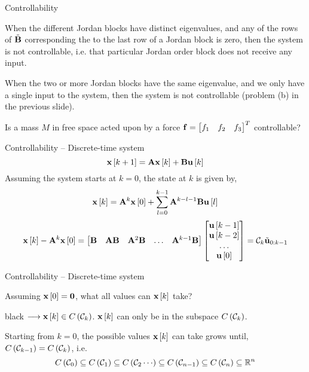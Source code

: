 \documentclass[aspectratio=169]{beamer}
\def\mf{\ensuremath\mathbf}
\def\mb{\ensuremath\mathbb}
\def\lp{\ensuremath\left(}
\def\rp{\ensuremath\right)}
\def\ls{\ensuremath\left[}
\def\rs{\ensuremath\right]}
\def\bmx{\ensuremath\begin{bmatrix*}[r]}
\def\emx{\ensuremath\end{bmatrix*}}
\def\bmxc{\ensuremath\begin{bmatrix*}[c]}
\newcommand{\demoexc}[3]{\onslide<#1->\begin{color}{#2} #3 \end{color}}
\newcommand{\ct}[1]{\lp #1\rp}
\newcommand{\dt}[1]{\ls #1\rs}
\begin{document}
\begin{frame}[t]{Controllability}


When the different Jordan blocks have distinct eigenvalues, and any of the rows of $\tilde{\mf{B}}$ corresponding the to the last row of a Jordan block is zero, then the system is not controllable, i.e. that particular Jordan order block does not receive any input.\vspace{0.2cm}

When the two or more Jordan blocks have the same eigenvalue, and we only have a single input to the system, then the system is not controllable (problem (b) in the previous slide).\vspace{0.2cm}


Is a mass $M$ in free space acted upon by a force $\mf{f} = \bmx f_1 & f_2 & f_3\emx^T$ controllable?
\end{frame}

\begin{frame}[t]{Controllability -- Discrete-time system}
\vspace{-0.2cm}
\[ \mf{x}\dt{k+1} = \mf{A}\mf{x}\dt{k} + \mf{B}\mf{u}\dt{k} \]
Assuming the system starts at $k=0$, the state at $k$ is given by,\vspace{-0.15cm}
\[ \mf{x}\dt{k} = \mf{A}^{k}\mf{x}\dt{0} + \sum_{l=0}^{k-1} \mf{A}^{k-l-1}\mf{B}\mf{u}\dt{l} \]\vspace{-0.15cm}
\[ \mf{x}\dt{k} - \mf{A}^{k}\mf{x}\dt{0} = \bmx \mf{B} & \mf{A}\mf{B} & \mf{A}^2\mf{B} & \ldots & \mf{A}^{k-1}\mf{B} \emx \bmxc \mf{u}\dt{k-1} \\ \mf{u}\dt{k-2} \\ \ldots \\ \mf{u}\dt{0} \emx = \mathcal{C}_k \tilde{\mf{u}}_{0:k-1} \]
\end{frame}

\begin{frame}[t]{Controllability -- Discrete-time system}

Assuming $\mf{x}\dt{0} = \mf{0}$, what all values can $\mf{x}\dt{k}$ take? \demoexc{2}{black}{ $\longrightarrow \mf{x}\dt{k} \in C\ct{\mathcal{C}_k}$. $\mf{x}\dt{k}$ can only be in the subspace $C\ct{\mathcal{C}_k}$.
\vspace{0.1cm}

Starting from $k=0$, the possible values $\mf{x}\dt{k}$ can take grows until, $C\ct{\mathcal{C}_{k-1}} = C\ct{\mathcal{C}_{k}}$, i.e.
\[ C\ct{\mathcal{C}_0} \subseteq C\ct{\mathcal{C}_1} \subseteq C\ct{\mathcal{C}_2 \cdots} \subseteq C\ct{\mathcal{C}_{n-1}} \subseteq C\ct{\mathcal{C}_{n}} \subseteq \mb{R}^n \]
}
\end{frame}
\end{document}
